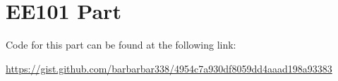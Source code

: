 \chapter{EE101 Part}

Code for this part can be found at the following link:

\bigbreak

\noindent \url{https://gist.github.com/barbarbar338/4954c7a930df8059dd4aaad198a93383}
